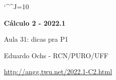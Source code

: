 \documentclass[oneside,12pt]{article}
\begin{document}
\catcode`\^^J=10
\pu
\def\pictgridstyle{\color{GrayPale}\linethickness{0.3pt}}
\def\pictaxesstyle{\linethickness{0.5pt}}
\def\pictnaxesstyle{\color{GrayPale}\linethickness{0.5pt}}
\celllower=2.5pt


\def\u#1{\par{\footnotesize \url{#1}}}

\def\drafturl{http://angg.twu.net/LATEX/2022-1-C2.pdf}
\def\drafturl{http://angg.twu.net/2022.1-C2.html}
\def\draftfooter{\tiny \href{\drafturl}{\jobname{}} \ColorBrown{\shorttoday{} \hours}}

\def\und#1#2{\underbrace{#1}_{#2}}



%

\thispagestyle{empty}

\begin{center}

\vspace*{1.2cm}

{\bf \Large Cálculo 2 - 2022.1}

\bsk

Aula 31: dicas pra P1

\bsk

Eduardo Ochs - RCN/PURO/UFF

\url{http://angg.twu.net/2022.1-C2.html}

\end{center}

\newpage


%                                                           

\end{document}
